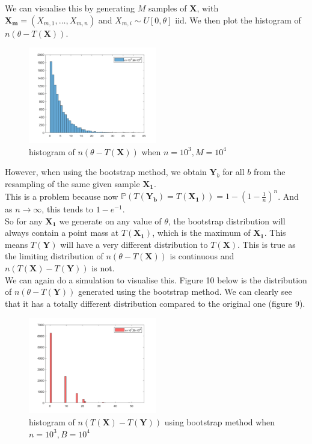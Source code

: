 \documentclass[10pt]{article}
\begin{document}
\noindent We can visualise this by generating $M$ samples of $\mathbf{X}$, with $\mathbf{X_m}=(X_{m,1},\dots,X_{m,n})$ and $X_{m,i}\sim U[0,\theta]$ iid. We then plot the histogram of $n(\theta-T(\mathbf{X}))$.
\begin{figure}[H]
\centering
\includegraphics[width=0.5\textwidth]{files/q7,test.png}
\caption{histogram of $n(\theta-T(\mathbf{X}))$ when $n=10^3,M=10^4$}
\end{figure}
\noindent However, when using the bootstrap method, we obtain $\mathbf{Y}_b$ for all $b$ from the resampling of the same given sample $\mathbf{X_1}$.\\
This is a problem because now $\mathds{P}(T(\mathbf{Y_b})=T(\mathbf{X_1}))=1-(1-\frac{1}{n})^n$. And as $n\to\infty$, this tends to $1-e^{-1}$.\\
So for any $\mathbf{X_1}$ we generate on any value of $\theta$, the bootstrap distribution will always contain a point mass at $T(\mathbf{X_1})$, which is the maximum of $\mathbf{X_1}$. This means $T(\mathbf{Y})$ will have a very different distribution to $T(\mathbf{X})$. This is true as the limiting distribution of $n(\theta-T(\mathbf{X}))$ is continuous and $n(T(\mathbf{X})-T(\mathbf{Y}))$ is not.\\
We can again do a simulation to visualise this. Figure 10 below is the distribution of $n(\theta-T(\mathbf{Y}))$ generated using the bootstrap method. We can clearly see that it has a totally different distribution compared to the original one (figure 9).\\
\begin{figure}[H]
\centering
\includegraphics[width=0.5\textwidth]{files/q7,bootstrap.png}
\caption{histogram of $n(T(\mathbf{X})-T(\mathbf{Y}))$ using bootstrap method when $n=10^3,B=10^4$}
\end{figure}
\end{document}
